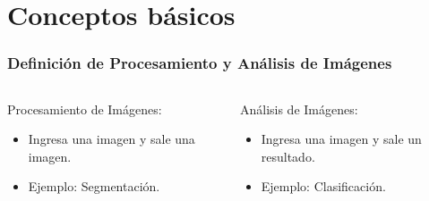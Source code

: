 \section{Conceptos básicos}

\begin{frame}
    \frametitle{Definición de Procesamiento y Análisis de Imágenes}
    \begin{columns}
    \begin{block}{Procesamiento de Imágenes:}
        \begin{itemize}
            \item Ingresa una imagen y sale una imagen.
            \item Ejemplo: Segmentación.
        \end{itemize}
    \end{block}
    
    \begin{block}{Análisis de Imágenes:}
        \begin{itemize}
            \item Ingresa una imagen y sale un resultado.
            \item Ejemplo: Clasificación.
        \end{itemize}
    \end{block}
    \end{columns}
\end{frame}

